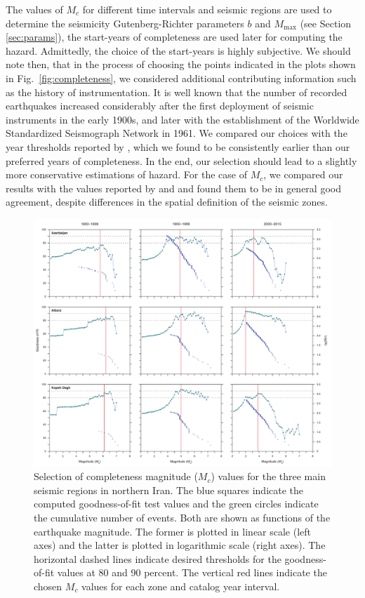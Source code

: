 The values of $M_c$ for different time intervals and seismic regions are used to determine the seismicity Gutenberg-Richter parameters $b$ and $M_{\max}$ (see Section \ref{sec:params}),  the start-years of completeness are used later for computing the hazard. Admittedly, the choice of the start-years is highly subjective. We should note then, that in the process of choosing the points indicated in the plots shown in Fig.~\ref{fig:completeness}, we considered additional contributing information such as the history of instrumentation. It is well known that the number of recorded earthquakes increased considerably after the first deployment of seismic instruments in the early 1900s, and later with the establishment of the Worldwide Standardized Seismograph Network in 1961. We compared our choices with the year thresholds reported by \citet{Zare2014}, which we found to be consistently earlier than our preferred years of completeness. In the end, our selection should lead to a slightly more conservative estimations of hazard. For the case of $M_c$, we compared our results with the values reported by \citet{Karimiparidari2013} and \citet{Khodaverdian_2016_BSSA} and found them to be in general good agreement, despite differences in the spatial definition of the seismic zones.

\begin{figure}[t]
    \centering
    \includegraphics[width=\textwidth]{figures/pdf/figure-06.pdf} 
    \caption{Selection of completeness magnitude ($M_c$) values for the three main seismic regions in northern Iran. The blue squares indicate the computed goodness-of-fit test values and the green circles indicate the cumulative number of events. Both are shown as functions of the earthquake magnitude. The former is plotted in linear scale (left axes) and the latter is plotted in logarithmic scale (right axes). The horizontal dashed lines indicate desired thresholds for the goodness-of-fit values at 80 and 90 percent. The vertical red lines indicate the chosen $M_c$ values for each zone and catalog year interval.}
    \label{fig:mc}
\end{figure}

